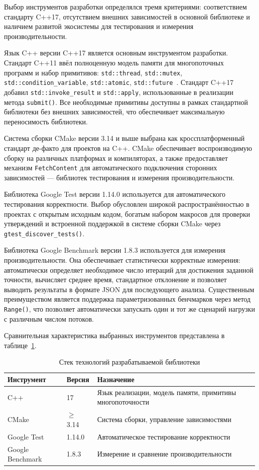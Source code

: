 Выбор инструментов разработки определялся тремя критериями:
соответствием стандарту C++17, отсутствием внешних зависимостей
в основной библиотеке и наличием развитой экосистемы для
тестирования и измерения производительности.

Язык C++ версии C++17 является основным инструментом
разработки. Стандарт C++11 ввёл полноценную модель памяти
для многопоточных программ и набор примитивов: \texttt{std::thread},
\texttt{std::mutex}, \texttt{std::condition\_variable},
\texttt{std::atomic}, \texttt{std::future}~\cite{Williams2019}.
Стандарт C++17 добавил \texttt{std::invoke\_result} и
\texttt{std::apply}, использованные в реализации метода
\texttt{submit()}. Все необходимые примитивы доступны в рамках
стандартной библиотеки без внешних зависимостей, что обеспечивает
максимальную переносимость библиотеки.

Система сборки CMake версии 3.14 и выше выбрана как
кроссплатформенный стандарт де-факто для проектов на C++.
CMake обеспечивает воспроизводимую сборку на различных
платформах и компиляторах, а также предоставляет механизм
\texttt{FetchContent} для автоматического подключения сторонних
зависимостей --- библиотек тестирования и измерения
производительности.

Библиотека Google Test версии 1.14.0 используется для
автоматического тестирования корректности. Выбор обусловлен
широкой распространённостью в проектах с открытым исходным
кодом, богатым набором макросов для проверки утверждений
и встроенной поддержкой в системе сборки CMake через
\texttt{gtest\_discover\_tests()}.

Библиотека Google Benchmark версии 1.8.3 используется для
измерения производительности. Она обеспечивает статистически
корректные измерения: автоматически определяет необходимое
число итераций для достижения заданной точности, вычисляет
среднее время, стандартное отклонение и позволяет выводить
результаты в формате JSON для последующего анализа.
Существенным преимуществом является поддержка параметризованных
бенчмарков через метод \texttt{Range()}, что позволяет
автоматически запускать один и тот же сценарий нагрузки
с различным числом потоков.

Сравнительная характеристика выбранных инструментов
представлена в таблице~\ref{tab:stack}.

\begin{table}[h]
\caption{Стек технологий разрабатываемой библиотеки}
\label{tab:stack}
\begin{tabularx}{\textwidth}{|l|l|X|}
\hline
\textbf{Инструмент} & \textbf{Версия} & \textbf{Назначение} \\
\hline
C++ & 17 & Язык реализации, модель памяти,
                 примитивы многопоточности \\
\hline
CMake & $\geq$ 3.14 & Система сборки, управление
                      зависимостями \\
\hline
Google Test & 1.14.0 & Автоматическое тестирование
                       корректности \\
\hline
Google Benchmark & 1.8.3 & Измерение и сравнение
                           производительности \\
\hline
\end{tabularx}
\end{table}

